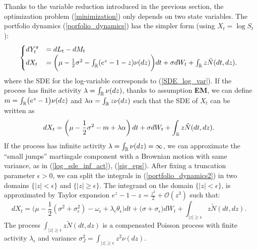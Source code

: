 Thanks to the variable reduction introduced in the previous section, the optimization problem (\ref{minimization}) only depends on two state variables. 
The portfolio dynamics (\ref{porfolio_dynamics}) has the simpler form (using $X_t = \log S_t$):
\begin{equation}\label{portfolio_dynamics2}
 \begin{cases}
 dY^{\pi}_t &=  dL_t - dM_t \\
 dX_t &= \biggl( \mu - \frac{1}{2} \sigma^2 - \int_{\mathbb{R}} (e^z-1-z) \nu(dz) \biggr) dt + \sigma dW_t + \int_{\mathbb{R}} z \tilde N (dt,dz).
\end{cases}
\end{equation} 
where the SDE for the log-variable corresponds to (\ref{SDE_log_var}).
If the process has finite activity $\lambda = \int_{\mathbb{R}} \nu(dz)$, thanks to assumption \textbf{EM},
we can define $m = \int_{\mathbb{R}} \bigl( e^z -1 \bigr) \nu(dz)$ and $\lambda \alpha = \int_{\mathbb{R}} z \nu(dz)$ such that the SDE of $X_t$ can be written as 
\begin{equation}\label{log_sde_fin_act2} 
 dX_t = \biggl( \mu - \frac{1}{2}\sigma^2 -m + \lambda \alpha \biggr) \,dt + \sigma dW_t + \int_{\mathbb{R}} z \tilde N(dt,dz). \\
\end{equation}
If the process has infinite activity $\lambda = \int_{\mathbb{R}} \nu(dz) = \infty$, 
we can approximate the ``small jumps'' martingale component with a Brownian motion with same variance, as in (\ref{log_sde_inf_act}), (\ref{sig_eps}).
After fixing a truncation parameter $\epsilon >0$, we can split the integrals in (\ref{portfolio_dynamics2}) in two domains $\{|z|<\epsilon\}$ and $\{|z|\geq \epsilon\}$.
The integrand on the domain $\{ |z|<\epsilon \}$, is approximated by Taylor expansion 
 $e^z-1-z = \frac{z^2}{2} + \mathcal{O}(z^3)$ such that:
\begin{equation}\label{log_sde_inf_act2}
   dX_t = \biggl( \mu - \frac{1}{2} (\sigma^2 + \sigma_{\epsilon}^2) - \omega_{\epsilon} + \lambda_{\epsilon} \theta_{\epsilon}  \biggr) dt + \bigl( \sigma+\sigma_{\epsilon}\bigr) dW_t 
       + \int_{|z|\geq \epsilon} z \tilde N(dt,dz). 
\end{equation}
The process $\int_{|z|\geq \epsilon} z \tilde N(dt,dz)$ is a compensated Poisson process with finite activity $\lambda_{\epsilon}$ 
and variance $\sigma_J^2 = \int_{|z| \geq \epsilon} z^2 \nu(dz) $.


